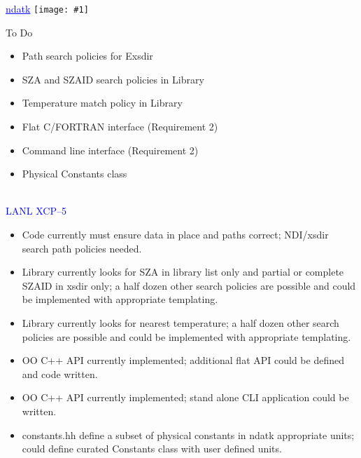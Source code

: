 \documentclass[clock]{slides}
\newenvironment{xslide}[1][logo.jpg]{\begin{slide} \tiny
\textcolor{blue}{\underline{ndatk}} \hfill
\texttt{[image: \#1]}
\normalsize}{\vfill\tiny
\textcolor{blue}{\hrulefill \\LANL XCP--5}
\end{slide}}
\begin{document}
\begin{xslide}
\begin{center}\Large
To Do
\end{center}

\begin{itemize}
\item Path search policies for Exsdir
\item SZA and SZAID search policies in Library
\item Temperature match policy in Library
\item Flat C/FORTRAN interface (Requirement 2)
\item Command line interface (Requirement 2)
\item Physical Constants class
\end{itemize}
\end{xslide}

\begin{note}\small
\begin{itemize}
\item Code currently must ensure data in place and paths correct;
  NDI/xsdir search path policies needed.
\item Library currently looks for SZA in library list only and partial
  or complete SZAID in xsdir only; a half dozen other search policies
  are possible and could be implemented with appropriate templating.
\item Library currently looks for nearest temperature; a half dozen
  other search policies are possible and could be implemented with
  appropriate templating.
\item OO C++ API currently implemented; additional flat API could be
  defined and code written.
\item OO C++ API currently implemented; stand alone CLI application
  could be written.
\item constants.hh define a subset of physical constants in ndatk
  appropriate units; could define curated Constants class with user
  defined units.
\end{itemize}
\end{note}
\end{document}
